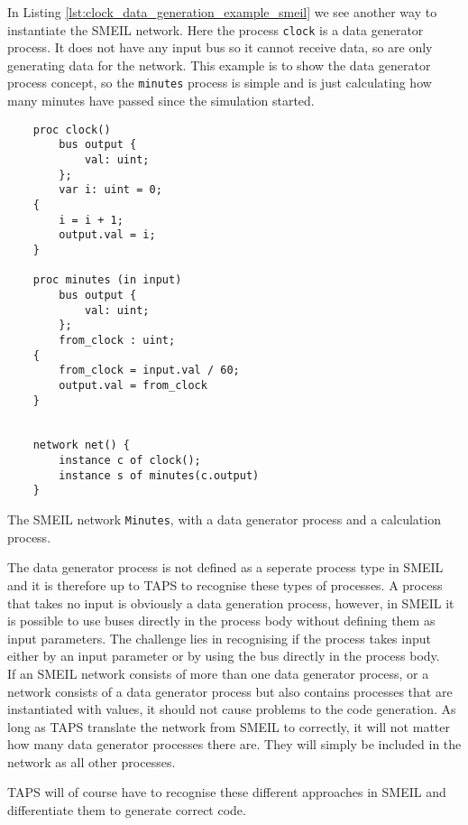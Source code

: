 In Listing \ref{lst:clock_data_generation_example_smeil} we see another way to instantiate the SMEIL network. Here the process \texttt{clock} is a data generator process. It does not have any input bus so it cannot receive data, so are only generating data for the network. This example is to show the data generator process concept, so the \texttt{minutes} process is simple and is just calculating how many minutes have passed since the simulation started.
\begin{listing}
    \begin{verbatim}
    proc clock()
        bus output {
            val: uint;
        };
        var i: uint = 0;
    {
        i = i + 1;
        output.val = i;
    }

    proc minutes (in input)
        bus output {
            val: uint;
        };
        from_clock : uint;
    {
        from_clock = input.val / 60;
        output.val = from_clock
    }


    network net() {
        instance c of clock();
        instance s of minutes(c.output)
    }
    \end{verbatim}
    \caption{The SMEIL network \texttt{Minutes}, with a data generator process and a calculation process.}
    \label{lst:clock_data_generation_example_smeil}
\end{listing}

The data generator process is not defined as a seperate process type in SMEIL and it is therefore up to TAPS to recognise these types of processes. A process that takes no input is obviously a data generation process, however, in SMEIL it is possible to use buses directly in the process body without defining them as input parameters. The challenge lies in recognising if the process takes input either by an input parameter or by using the bus directly in the process body.\\

If an SMEIL network consists of more than one data generator process, or a network consists of a data generator process but also contains processes that are instantiated with values, it should not cause problems to the \cspm{} code generation. As long as TAPS translate the network from SMEIL to \cspm{} correctly, it will not matter how many data generator processes there are. They will simply be included in the network as all other processes.

TAPS will of course have to recognise these different approaches in SMEIL and differentiate them to generate correct \cspm{} code.

